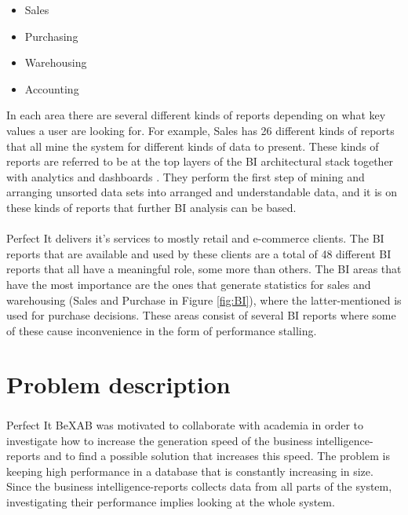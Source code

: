 \documentclass{cslthse-msc}
\newcommand{\bex}{BeX\textsuperscript{\textregistered}}
\begin{document}
\begin{itemize}
\item Sales
\item Purchasing
\item Warehousing
\item Accounting
\end{itemize}

In each area there are several different kinds of reports depending on what key values a user are looking for. For example, Sales has 26 different kinds of reports that all mine the system for different kinds of data to present. These kinds of reports are referred to be at the top layers of the BI architectural stack together with analytics and dashboards \cite{Evelson10}. They perform the first step of mining and arranging unsorted data sets into arranged and understandable data, and it is on these kinds of reports that further BI analysis can be based.\\\\
Perfect It delivers it's services to mostly retail and e-commerce clients. The BI reports that are available and used by these clients are a total of 48 different BI reports that all have a meaningful role, some more than others. The BI areas that have the most importance are the ones that generate statistics for sales and warehousing (Sales and Purchase in Figure \ref{fig:BI}), where the latter-mentioned is used for purchase decisions. These areas consist of several BI reports where some of these cause inconvenience in the form of performance stalling. 

\section{Problem description}
Perfect It \bex AB was motivated to collaborate with academia in order to investigate how to increase the generation speed of the business intelligence-reports and to find a possible solution that increases this speed. The problem is keeping high performance in a database that is constantly increasing in size. Since the business intelligence-reports collects data from all parts of the system, investigating their performance implies looking at the whole system.
\end{document}
